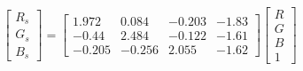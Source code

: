 \begin{equation}
\begin{bmatrix}
  R_s \\ G_s \\ B_s 
\end{bmatrix}=
\left[\begin{matrix}1.972 & 0.084 & -0.203 & -1.83\\ 
-0.44 & 2.484 & -0.122 & -1.61\\ 
-0.205 & -0.256 & 2.055 & -1.62\end{matrix}\right]
\begin{bmatrix}
  R \\ G \\ B \\ 1 
\end{bmatrix}
\end{equation}
